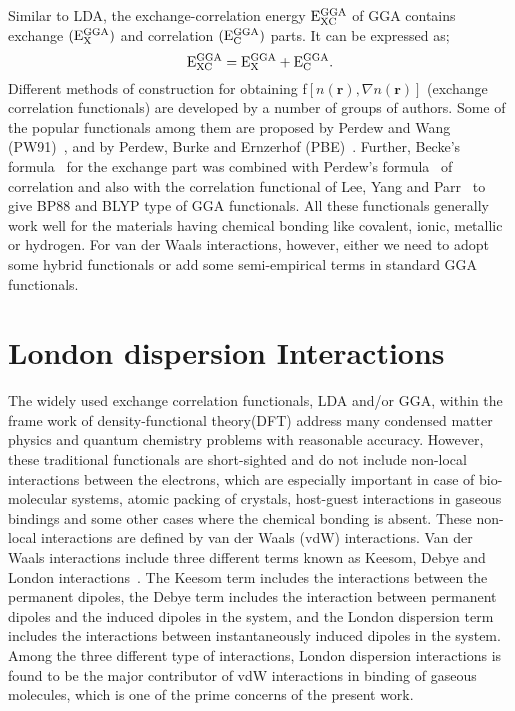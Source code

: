 Similar to LDA, the exchange-correlation energy ${\rm E}_{\rm XC}^{\rm GGA}$ of GGA contains exchange $({\rm E}_{\rm X}^{\rm GGA})$ and correlation $({\rm E}_{\rm C}^{\rm GGA})$ parts. It can be expressed as;
\begin{equation}
{\rm E}_{\rm XC}^{\rm GGA} = {\rm E}_{\rm X}^{\rm GGA} + {\rm E}_{\rm C}^{\rm GGA}.
\end{equation}
Different methods of construction for obtaining f$[n(\textbf{r}),\nabla n(\textbf{r})]$ (exchange correlation functionals) are developed by a number of groups of authors. Some of the popular functionals among them are proposed by Perdew and Wang (PW91)~\citep{Perdew1992}, and by Perdew, Burke and Ernzerhof (PBE)~\citep{Perdew1996}. Further, Becke's formula~\citep{Becke1988} for the exchange part was combined with Perdew's formula~\citep{Perdew1986} of correlation and also with the correlation functional of Lee, Yang and Parr~\citep{Lee1988} to give BP88 and BLYP type of GGA functionals. All these functionals generally work well for the materials having chemical bonding like covalent, ionic, metallic or hydrogen. For van der Waals interactions, however, either we need to adopt some hybrid functionals or add some semi-empirical terms in standard GGA functionals.
\section{London dispersion Interactions}
The widely used exchange correlation functionals, LDA and/or GGA, within the frame work of density-functional theory(DFT) address many condensed matter physics and quantum chemistry problems with reasonable accuracy. However, these traditional functionals are short-sighted and do not include non-local interactions between the electrons, which are especially important in case of bio-molecular systems, atomic packing of crystals, host-guest interactions in gaseous bindings and some other cases where the chemical bonding is absent. These non-local interactions are defined by van der Waals (vdW) interactions. Van der Waals interactions include three different terms known as Keesom, Debye and London interactions~\citep{Ulman2014}. The Keesom term includes the interactions between the permanent dipoles, the Debye term includes the interaction between permanent dipoles and the induced dipoles in the system, and the London dispersion term includes the interactions between instantaneously induced dipoles in the system. Among the three different type of interactions, London dispersion interactions is found to be the major contributor of vdW interactions in binding of gaseous molecules, which is one of the prime concerns of the present work. 

